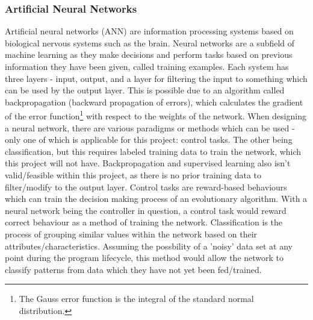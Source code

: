 \documentclass[12pt,a4paper]{article}
\begin{document}
\subsubsection{Artificial Neural Networks}
Artificial neural networks (ANN) are information processing systems based on biological nervous systems such as the brain. Neural networks are a subfield of machine learning as they make decisions and perform tasks based on previous information they have been given, called training examples. Each system has three layers - input, output, and a layer for filtering the input to something which can be used by the output layer. This is possible due to an algorithm called backpropagation (backward propagation of errors), which calculates the gradient of the error function\footnote{The Gauss error function is the integral of the standard normal distribution.} with respect to the weights of the network. When designing a neural network, there are various paradigms or methods which can be used - only one of which is applicable for this project: control tasks. The other being classification, but this requires labeled training data to train the network, which this project will not have. Backpropagation and supervised learning also isn't valid/feasible within this project, as there is no prior training data to filter/modify to the output layer. Control tasks are reward-based behaviours which can train the decision making process of an evolutionary algorithm. With a neural network being the controller in question, a control task would reward correct behaviour as a method of training the network. Classification is the process of grouping similar values within the network based on their attributes/characteristics. Assuming the possbility of a 'noisy' data set at any point during the program lifecycle, this method would allow the network to classify patterns from data which they have not yet been fed/trained.
\end{document}
